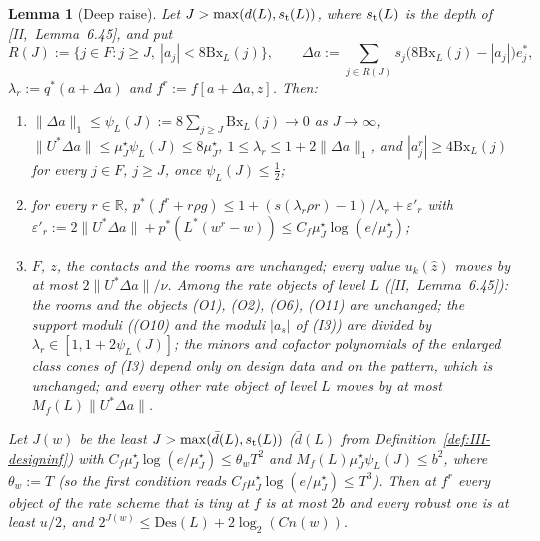 \documentclass[10pt]{amsart}
\newtheorem{lemma}[theorem]{Lemma}
\theoremstyle{definition}
\theoremstyle{remark}
\newcommand{\R}{\mathbb R}
\newcommand{\zh}{\hat z}
\begin{document}
\begin{lemma}[Deep raise]\label{lem:III-deepraise}
Let $J>\max(d(L),s_{\rm t}(L))$, where $s_{\rm t}(L)$ is the depth of
[II,~Lemma~6.45], and put
\[
 R(J):=\{j\in F:j\ge J,\ |a_j|<8\mathrm{Bx}_L(j)\},\qquad
 \Delta a:=\sum_{j\in R(J)}s_j\big(8\mathrm{Bx}_L(j)-|a_j|\big)e^*_j,
\]
$\lambda_r:=q^*(a+\Delta a)$ and $f^r:=f[a+\Delta a,z]$.  Then:
\begin{enumerate}
\item[(a)] $\|\Delta a\|_1\le\psi_L(J):=8\sum_{j\ge J}\mathrm{Bx}_L(j)\to0$ as
$J\to\infty$, $\|U^*\Delta a\|\le\mu^\star_J\psi_L(J)\le8\mu^\star_J$,
$1\le\lambda_r\le1+2\|\Delta a\|_1$, and $|a^r_j|\ge4\mathrm{Bx}_L(j)$ for every
$j\in F$, $j\ge J$, once $\psi_L(J)\le\frac12$;
\item[(b)] for every $r\in\R$, $p^*(f^r+r\rho g)\le1+(s(\lambda_r\rho r)-1)/
\lambda_r+\varepsilon'_r$ with $\varepsilon'_r:=2\|U^*\Delta a\|+
p^*(L^*(w^r-w))\le C_f\mu^\star_J\log(e/\mu^\star_J)$;
\item[(c)] $F$, $z$, the contacts and the rooms are unchanged; every value
$u_k(\zh)$ moves by at most $2\|U^*\Delta a\|/\nu$.  Among the rate objects of
level $L$ \textup{(}[II,~Lemma~6.45]\textup{)}: the rooms and the objects
\textup{(O1)}, \textup{(O2)}, \textup{(O6)}, \textup{(O11)} are unchanged; the
support moduli \textup{(}\textup{(O10)} and the moduli $|a_s|$ of
\textup{(I3)}\textup{)} are divided by $\lambda_r\in[1,1+2\psi_L(J)]$; the minors
and cofactor polynomials of the enlarged class cones of \textup{(I3)} depend
only on design data and on the pattern, which is unchanged; and every other
rate object of level $L$ moves by at most $M_f(L)\|U^*\Delta a\|$.
\end{enumerate}
Let $J(w)$ be the least $J>\max(\bar d(L),s_{\rm t}(L))$
\textup{(}$\bar d(L)$ from Definition~\textup{\ref{def:III-designinf}}\textup{)}
with $C_f\mu^\star_J\log(e/\mu^\star_J)\le\theta_wT^2$ and $M_f(L)\mu^\star_J
\psi_L(J)\le b^2$, where $\theta_w:=T$ \textup{(}so the first condition reads
$C_f\mu^\star_J\log(e/\mu^\star_J)\le T^3$\textup{)}.  Then at $f^r$ every object of the rate scheme that is tiny at
$f$ is at most $2b$ and every robust one is at least $u/2$, and
$2^{J(w)}\le\mathrm{Des}(L)+2\log_2(Cn(w))$.
\end{lemma}
\end{document}
